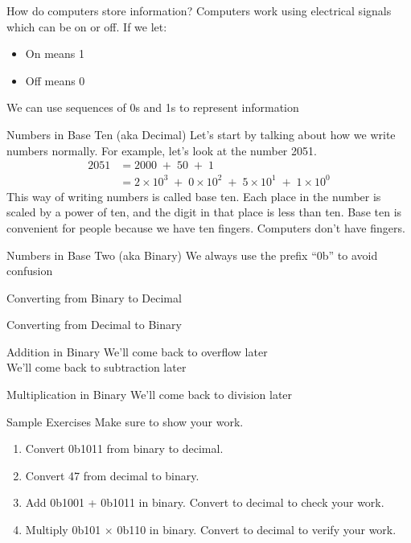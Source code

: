 

\begin{frame}{How do computers store information?}
Computers work using electrical signals which can be on or off. If we let:
\begin{itemize}
    \item On means 1
    \item Off means 0
\end{itemize}
We can use sequences of 0s and 1s to represent information
\end{frame}


\begin{frame}{Numbers in Base Ten (aka Decimal)}
Let's start by talking about how we write numbers normally. For example, let's look at the number 2051. 
\begin{align*}
2051 &= 2000 \;+\; 50 \;+\; 1 \\
&= 2 \times 10^3 \;+\; 0 \times 10^2 \;+\; 5 \times 10^1 \;+\; 1 \times 10^0
\end{align*}
This way of writing numbers is called base ten. Each place in the number is scaled by a power of ten, and the digit in that place is less than ten. 
Base ten is convenient for people because we have ten fingers. 
Computers don't have fingers.
\end{frame}
    
\begin{frame}{Numbers in Base Two (aka Binary)}
We always use the prefix ``0b'' to avoid confusion
\end{frame}

\begin{frame}{Converting from Binary to Decimal}
\end{frame}

\begin{frame}{Converting from Decimal to Binary}
\end{frame}

\begin{frame}{Addition in Binary}
We'll come back to overflow later \\
We'll come back to subtraction later
\end{frame}
    
\begin{frame}{Multiplication in Binary}
We'll come back to division later
\end{frame}

\begin{frame}{Sample Exercises}
Make sure to show your work.
\vfill 
\begin{enumerate}
    \item Convert 0b1011 from binary to decimal. 
    \vfill
    \item Convert 47 from decimal to binary.
    \vfill
    \item Add 0b1001 + 0b1011 in binary. Convert to decimal to check your work.
    \vfill
    \item Multiply 0b101 $\times$ 0b110 in binary. Convert to decimal to verify your work.
    \vfill 
\end{enumerate}
\end{frame}

